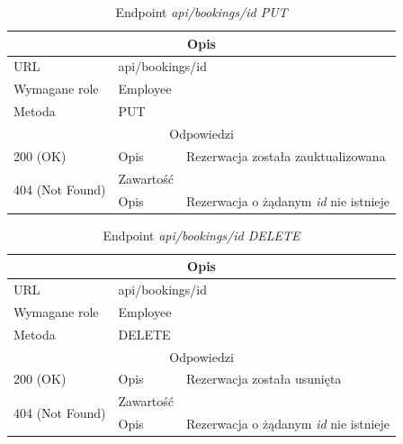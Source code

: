 \documentclass[eng,printmode,openany]{mgr}
\begin{document}
\begin{table}[H]
	\caption{Endpoint \textit{api/bookings/id PUT}}
	\begin{tabularx}{\textwidth}{|l|l|X|}
		\hline
		\multicolumn{3}{|c|}{Opis}
		\\ \hline
		URL                       & \multicolumn{2}{l|}{api/bookings/id}
		\\ \hline
		Wymagane role             & \multicolumn{2}{l|}{Employee}
		\\ \hline
		Metoda                    & \multicolumn{2}{l|}{PUT}
		\\ \hline
		\multicolumn{3}{|c|}{Odpowiedzi}
		\\ \hline
		200 (OK) 		                        & Opis      	& Rezerwacja została zauktualizowana
		\\ \hline
		\multirow{2}{*}{404 (Not Found)} 	    & Zawartość     & 
		\\ \cline{2-3}                          & Opis          & Rezerwacja o żądanym \textit{id} nie istnieje
		\\ \hline
	\end{tabularx}
\end{table}

\begin{table}[H]
	\caption{Endpoint \textit{api/bookings/id DELETE}}
	\begin{tabularx}{\textwidth}{|l|l|X|}
		\hline
		\multicolumn{3}{|c|}{Opis}
		\\ \hline
		URL                       & \multicolumn{2}{l|}{api/bookings/id}
		\\ \hline
		Wymagane role             & \multicolumn{2}{l|}{Employee}
		\\ \hline
		Metoda                    & \multicolumn{2}{l|}{DELETE}
		\\ \hline
		\multicolumn{3}{|c|}{Odpowiedzi}
		\\ \hline
		200 (OK)			                & Opis         	& Rezerwacja została usunięta
		\\ \hline
		\multirow{2}{*}{404 (Not Found)} 	& Zawartość     & 
		\\ \cline{2-3}                      & Opis          & Rezerwacja o żądanym \textit{id} nie istnieje
		\\ \hline
	\end{tabularx}
\end{table}
\end{document}
